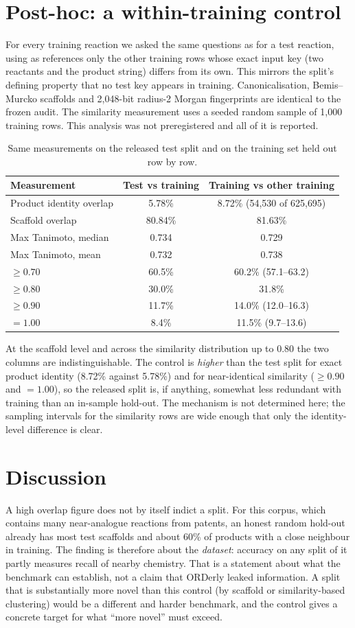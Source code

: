 \documentclass[11pt]{article}
\begin{document}
\section{Post-hoc: a within-training control}
For every training reaction we asked the same questions as for a test reaction, using as references only the other training rows whose
exact input key (two reactants and the product string) differs from its own. This mirrors the split's defining property that no test
key appears in training. Canonicalisation, Bemis--Murcko scaffolds and 2{,}048-bit radius-2 Morgan fingerprints are identical to the
frozen audit. The similarity measurement uses a seeded random sample of 1{,}000 training rows. This analysis was not preregistered
and all of it is reported.
\begin{table}[h]
\centering\small
\begin{tabular}{lcc}
\toprule
Measurement & Test vs training & Training vs other training\\
\midrule
Product identity overlap & 5.78\% & 8.72\% (54{,}530 of 625{,}695)\\
Scaffold overlap & 80.84\% & 81.63\%\\
Max Tanimoto, median & 0.734 & 0.729\\
Max Tanimoto, mean & 0.732 & 0.738\\
$\ge0.70$ & 60.5\% & 60.2\% (57.1--63.2)\\
$\ge0.80$ & 30.0\% & 31.8\%\\
$\ge0.90$ & 11.7\% & 14.0\% (12.0--16.3)\\
$=1.00$ & 8.4\% & 11.5\% (9.7--13.6)\\
\bottomrule
\end{tabular}
\caption{Same measurements on the released test split and on the training set held out row by row.}
\end{table}
At the scaffold level and across the similarity distribution up to 0.80 the two columns are indistinguishable. The control is
\emph{higher} than the test split for exact product identity (8.72\% against 5.78\%) and for near-identical similarity
($\ge0.90$ and $=1.00$), so the released split is, if anything, somewhat less redundant with training than an in-sample hold-out. The
mechanism is not determined here; the sampling intervals for the similarity rows are wide enough that only the identity-level
difference is clear.

\section{Discussion}
A high overlap figure does not by itself indict a split. For this corpus, which contains many near-analogue reactions from patents, an
honest random hold-out already has most test scaffolds and about 60\% of products with a close neighbour in training. The finding is
therefore about the \emph{dataset}: accuracy on any split of it partly measures recall of nearby chemistry. That is a statement about
what the benchmark can establish, not a claim that ORDerly leaked information. A split that is substantially more novel than this
control (by scaffold or similarity-based clustering) would be a different and harder benchmark, and the control gives a concrete target
for what ``more novel'' must exceed.
\end{document}

